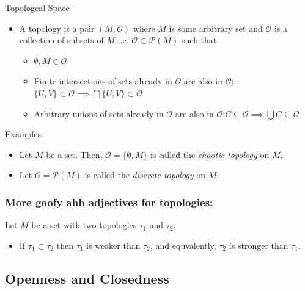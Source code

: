 \documentclass{article}
\begin{document}
\begin{mathdefinitionbox}{Topologcal Space}
  \begin{itemize}
    \item A topology is a pair $(M, \mathcal{O})$ where $M$ is some arbitrary set and $\mathcal{O}$ is a collection of subsets of $M$ i.e. $\mathcal{O} \subset \mathcal{P}(M)$ such that 
    \begin{itemize}
      \item $\emptyset, M \in \mathcal{O}$
      \item Finite intersections of sets already in $\mathcal{O}$ are also in $\mathcal{O}$: $\{ U, V \} \subset \mathcal{O} \implies \bigcap \{ U, V\} \subset \mathcal{O}$ 
      \item Arbitrary unions of sets already in $\mathcal{O}$ are also in $\mathcal{O}$:$C \subseteq \mathcal{O} \implies \bigcup C \subseteq \mathcal{O}$ 
    \end{itemize}
  \end{itemize}
\end{mathdefinitionbox}

\vskip 0.5cm
\begin{dottedbox}
  Examples:
  \begin{itemize}
    \item Let $M$ be a set. Then, $\mathcal{O} = \{\emptyset, M\}$ is called the \emph{chaotic topology} on $M$.
    \item Let $\mathcal{O} = \mathcal{P}(M)$ is called the \emph{discrete topology} on $M$.  
  \end{itemize}
\end{dottedbox}

\vskip 0.5cm
\subsubsection*{More goofy ahh adjectives for topologies:}

\begin{dottedbox}
  Let $M$ be a set with two topologies $\tau_1$ and $\tau_2$.
  \begin{itemize}
    \item If $\tau_1 \subset \tau_2$ then $\tau_1$ is \underline{weaker} than $\tau_2$, and equvalently, $\tau_2$ is \underline{stronger} than $\tau_1$.
  \end{itemize}
\end{dottedbox}

\vskip 0.5cm
\subsection{Openness and Closedness}
\end{document}
